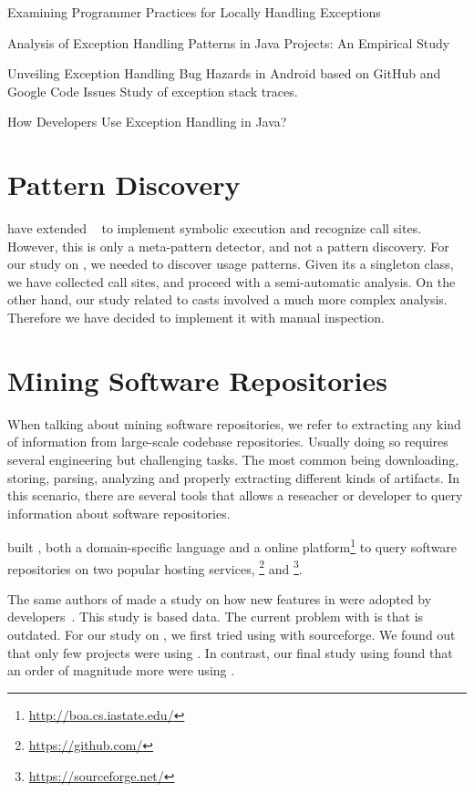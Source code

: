 Examining Programmer Practices for Locally Handling Exceptions
\cite{Kery:2016:EPP:2901739.2903497}

Analysis of Exception Handling Patterns in Java Projects: An Empirical Study
\cite{Nakshatri:2016:AEH:2901739.2903499}

\cite{7180074}
Unveiling Exception Handling Bug Hazards in Android based on GitHub and Google Code Issues
Study of exception stack traces.

How Developers Use Exception Handling in Java?
\cite{Asaduzzaman:2016:DUE:2901739.2903500}



\section{Pattern Discovery}

\cite{5463349} have extended \asm{}~\cite{Bruneton02asm:a,Kuleshov07} to implement symbolic execution and recognize call sites.
However, this is only a meta-pattern detector, and not a pattern discovery.
For our study on \smu{}, we needed to discover usage patterns.
Given its a singleton class, we have collected call sites,
and proceed with a semi-automatic analysis.
On the other hand, our study related to casts involved a much more complex analysis.
Therefore we have decided to implement it with manual inspection.

\section{Mining Software Repositories}

When talking about mining software repositories, we refer to extracting any kind of information from large-scale codebase repositories.
Usually doing so requires several engineering but challenging tasks.
The most common being downloading, storing, parsing, analyzing and properly extracting different kinds of artifacts.
In this scenario, there are several tools that allows a reseacher or developer to query information about software repositories.

\cite{Dyer-Nguyen-Rajan-Nguyen-13, Dyer-Rajan-Nguyen-13} built \boa{}, both a domain-specific language and a online platform\footnote{\url{http://boa.cs.iastate.edu/}} to query software repositories on two popular hosting services, \github{}\footnote{\url{https://github.com/}} and \sourceforge{}\footnote{\url{https://sourceforge.net/}}.

The same authors of \boa{} made a study on how new features in \java{} were adopted by developers~\cite{Dyer-Rajan-Nguyen-Nguyen-14}.
This study is based \sourceforge{} data.
The current problem with \sourceforge{} is that is outdated.
For our study on \smu{}, we first tried using \boa{} with sourceforge{}.
We found out that only few projects were using \smu{}.
In contrast, our final study using \maven{} found that an order of magnitude more were using \smu{}.

